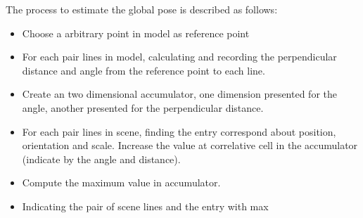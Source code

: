 The process to estimate the global pose is described as follows:
\begin{itemize}
\item Choose a arbitrary point in model as reference point
\item For each pair lines in model, calculating and recording the perpendicular distance and angle from the reference point to each line.
\item Create an two dimensional accumulator, one dimension presented for the angle, another presented for the perpendicular distance.
\item For each pair lines in scene, finding the entry correspond about position, orientation and scale. Increase the value at correlative cell in the accumulator (indicate by the angle and distance).
\item Compute the maximum value in accumulator.
\item Indicating the pair of scene lines and the entry with max
\end{itemize}
































